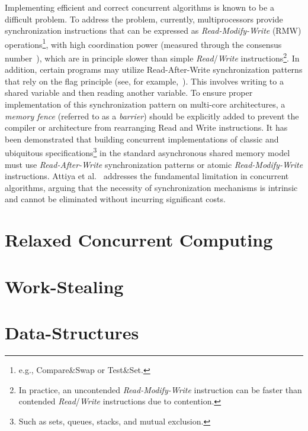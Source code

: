 Implementing efficient and correct concurrent algorithms is known to be a difficult problem.
To address the problem, currently, multiprocessors provide synchronization instructions that can be expressed as \textit{Read-Modify-Write} (RMW) operations\footnote{e.g., Compare\&Swap or Test\&Set.}, with high coordination power (measured through the consensus number~\cite{DBLP_journals_toplas_Herlihy91}), which are in principle slower than simple \textit{Read}/\textit{Write} instructions\footnote{In practice, an uncontended \textit{Read-Modify-Write} instruction can be faster than contended \textit{Read}/\textit{Write} instructions due to contention.}. In addition, certain programs may utilize Read-After-Write synchronization patterns that rely on the flag principle (see, for example,~\cite {DBLP_books_daglib_0020056}). This involves writing to a shared variable and then reading another variable. To ensure proper implementation of this synchronization pattern on multi-core architectures, a \textit{memory fence} (referred to as a \textit{barrier}) should be explicitly added to prevent the compiler or architecture from rearranging Read and Write instructions. It has been demonstrated that building concurrent implementations of classic and ubiquitous specifications\footnote{Such as sets, queues, stacks, and mutual exclusion.} in the standard asynchronous shared memory model must use \textit{Read-After-Write} synchronization patterns or atomic \textit{Read-Modify-Write} instructions. Attiya et al.~\cite{DBLP_conf_popl_AttiyaGHKMV11} addresses the fundamental limitation in concurrent algorithms, arguing that the necessity of synchronization mechanisms is intrinsic and cannot be eliminated without incurring significant costs.

\section{\label{section:relaxed-concurrent}Relaxed Concurrent Computing}



\section{\label{section:work-stealing}Work-Stealing}
\section{\label{section:data-structures}Data-Structures}


